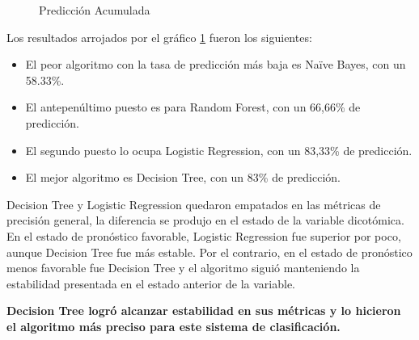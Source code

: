 \begin{center}
    	\begin{figure}[H]
	\centering
	\caption{Predicción Acumulada}
	\label{fig:pa}
	\end{figure}
\end{center}
    
    Los resultados arrojados por el gráfico \ref{fig:pa} fueron los siguientes:
\begin{itemize}
	\item El peor algoritmo con la tasa de predicción más baja es Naïve Bayes, con un 58.33\%.
	\item El antepenúltimo puesto es para Random Forest, con un 66,66\% de predicción.
	\item El segundo puesto lo ocupa Logistic Regression, con un 83,33\% de predicción.
	\item El mejor algoritmo es Decision Tree, con un 83\% de predicción.
\end{itemize}   

	Decision Tree y Logistic Regression quedaron empatados en las métricas de precisión general, la diferencia se produjo en el estado de la variable dicotómica. En el estado de pronóstico favorable, Logistic Regression fue superior por poco, aunque Decision Tree fue más estable. Por el contrario, en el estado de pronóstico menos favorable fue Decision Tree y el algoritmo siguió manteniendo la estabilidad presentada en el estado anterior de la variable.
\par \textbf{Decision Tree logró alcanzar estabilidad en sus métricas y lo hicieron el algoritmo más preciso para este sistema de clasificación.}
